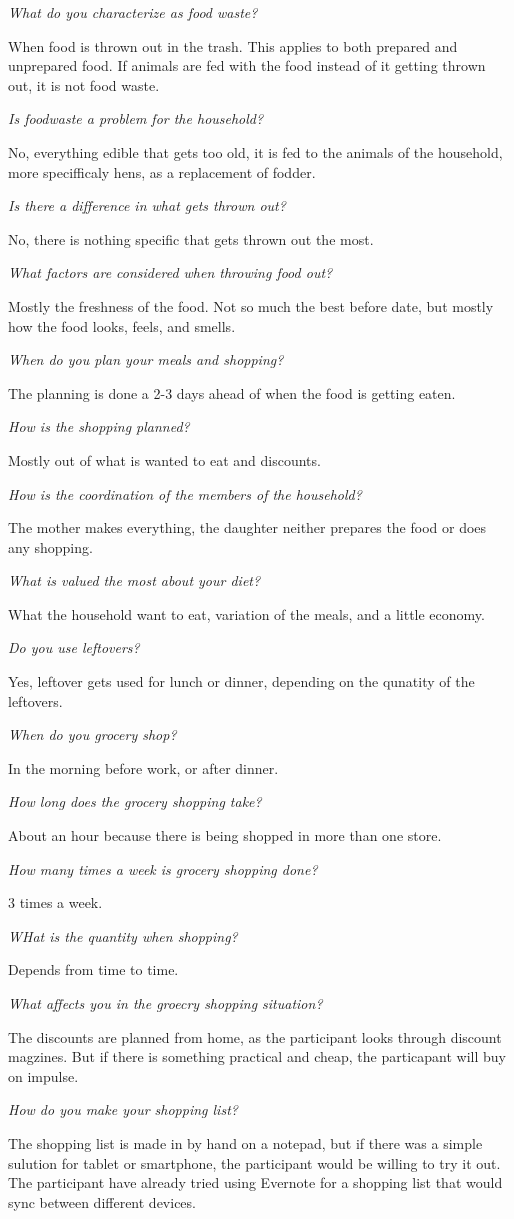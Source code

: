 \emph{What do you characterize as food waste?}

When food is thrown out in the trash. This applies to both prepared and unprepared food. If animals are fed with the food instead of it getting thrown out, it is not food waste.

\emph{Is foodwaste a problem for the household?}

No, everything edible that gets too old, it is fed to the animals of the household, more specifficaly hens, as a replacement of fodder.

\emph{Is there a difference in what gets thrown out?}

No, there is nothing specific that gets thrown out the most.

\emph{What factors are considered when throwing food out?}

Mostly the freshness of the food. Not so much the best before date, but mostly how the food looks, feels, and smells.

\emph{When do you plan your meals and shopping?}

The planning is done a 2-3 days ahead of when the food is getting eaten.

\emph{How is the shopping planned?}

Mostly out of what is wanted to eat and discounts.

\emph{How is the coordination of the members of the household?}

The mother makes everything, the daughter neither prepares the food or does any shopping.

\emph{What is valued the most about your diet?}

What the household want to eat, variation of the meals, and a little economy.

\emph{Do you use leftovers?}

Yes, leftover gets used for lunch or dinner, depending on the qunatity of the leftovers.

\emph{When do you grocery shop?}

In the morning before work, or after dinner.

\emph{How long does the grocery shopping take?}

About an hour because there is being shopped in more than one store.

\emph{How many times a week is grocery shopping done?}

3 times a week.

\emph{WHat is the quantity when shopping?}

Depends from time to time.

\emph{What affects you in the groecry shopping situation?}

The discounts are planned from home, as the participant looks through discount magzines. But if there is something practical and cheap, the particapant will buy on impulse.

\emph{How do you make your shopping list?}

The shopping list is made in by hand on a notepad, but if there was a simple sulution for tablet or smartphone, the participant would be willing to try it out. The participant have already tried using Evernote for a shopping list that would sync between different devices.